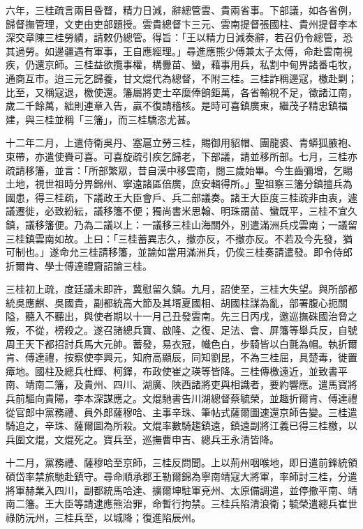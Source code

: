 \begin{pinyinscope}
六年，三桂疏言兩目昏瞀，精力日減，辭總管雲、貴兩省事。下部議，如各省例，歸督撫管理，文吏由吏部題授。雲貴總督卞三元、雲南提督張國柱、貴州提督李本深交章陳三桂勞績，請敕仍總管。得旨：「王以精力日減奏辭，若召仍令總管，恐其過勞。如邊疆遇有軍事，王自應經理。」尋進應熊少傅兼太子太傅，命赴雲南視疾，仍還京師。三桂益欲攬事權，構釁苗、蠻，藉事用兵，私割中甸畀諸番屯牧，通商互市。迨三元乞歸養，甘文焜代為總督，不附三桂。三桂詐稱邊寇，檄赴剿；比至，又稱寇退，檄使還。籓屬將吏士卒糜俸餉鉅萬，各省輸稅不足，徵諸江南，歲二千餘萬，絀則連章入告，贏不復請稽核。是時可喜鎮廣東，繼茂子精忠鎮福建，與三桂並稱「三籓」，而三桂驕恣尤甚。

十二年二月，上遣侍衛吳丹、塞扈立勞三桂，賜御用貂帽、團龍裘、青蟒狐腋袍、束帶，亦遣使賚可喜。可喜旋疏引疾乞歸老，下部議，請並移所部。七月，三桂亦疏請移籓，並言：「所部繁眾，昔自漢中移雲南，閱三歲始畢。今生齒彌增，乞賜土地，視世祖時分畀錦州、寧遠諸區倍廣，庶安輯得所。」聖祖察三籓分鎮擅兵為國患，得三桂疏，下議政王大臣會戶、兵二部議奏。諸王大臣度三桂疏非由衷，遽議遷徙，必致紛紜，議移籓不便；獨尚書米思翰、明珠謂苗、蠻既平，三桂不宜久鎮，議移籓便。乃為二議以上：一議移三桂山海關外，別遣滿洲兵戍雲南；一議留三桂鎮雲南如故。上曰：「三桂蓄異志久，撤亦反，不撤亦反。不若及今先發，猶可制也。」遂命允三桂請移籓，並諭如當用滿洲兵，仍俟三桂奏請遣發。即令侍郎折爾肯、學士傅達禮齎詔諭三桂。

三桂初上疏，度廷議未即許，冀慰留久鎮。九月，詔使至，三桂大失望。與所部都統吳應麒、吳國貴，副都統高大節及其壻夏國相、胡國柱謀為亂，部署腹心扼關隘，聽入不聽出，與使者期以十一月己丑發雲南。先三日丙戌，邀巡撫硃國治脅之叛，不從，榜殺之。遂召諸總兵寶、啟隆、之復、足法、會、屏籓等舉兵反，自號周王天下都招討兵馬大元帥。蓄發，易衣冠，幟色白，步騎皆以白氈為帽。執折爾肯、傅達禮，按察使李興元，知府高顯辰，同知劉昆，不為三桂屈，具楚毒，徙置瘴地。國柱及總兵杜輝、柯鐸，布政使崔之瑛等皆降。三桂傳檄遠近，並致書平南、靖南二籓，及貴州、四川、湖廣、陜西諸將吏與相識者，要約響應。遣馬寶將兵前驅向貴陽，李本深謀應之。文焜馳書告川湖總督蔡毓榮，並趣折爾肯、傅達禮從官郎中黨務禮、員外郎薩穆哈、主事辛珠、筆帖式薩爾圖速還京師告變。三桂遣騎追之，辛珠、薩爾圖為所殺。文焜率數騎趨鎮遠，鎮遠副將江義已得三桂檄，以兵圍文焜，文焜死之。寶兵至，巡撫曹申吉、總兵王永清皆降。

十二月，黨務禮、薩穆哈至京師，三桂反問聞。上以荊州咽喉地，即日遣前鋒統領碩岱率禁旅馳赴鎮守。尋命順承郡王勒爾錦為寧南靖寇大將軍，率師討三桂，分遣將軍赫業入四川，副都統馬哈達、擴爾坤駐軍兗州、太原備調遣，並停撤平南、靖南二籓。王大臣等請逮應熊治罪，命暫行拘禁。三桂兵陷清浪衛；毓榮遣總兵崔世祿防沅州，三桂兵至，以城降；復進陷辰州。


\end{pinyinscope}
